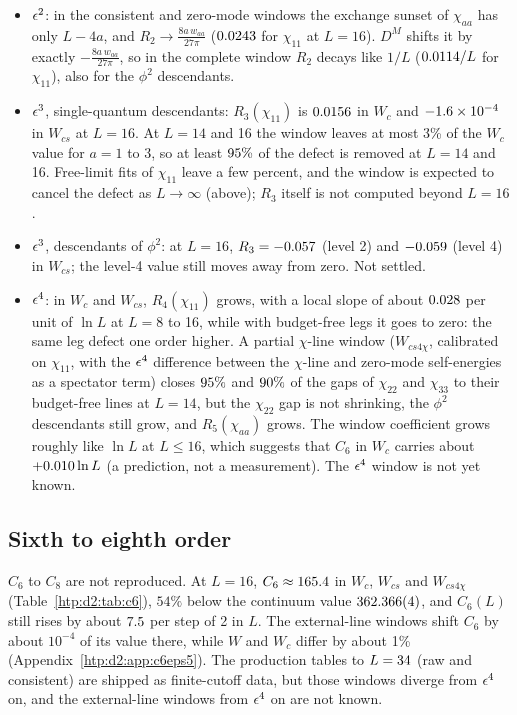 \begin{itemize}
\item $\epsilon^2$: in the consistent and zero-mode windows the exchange sunset of $\chi_{aa}$ has only $L-4a$, and
 $R_2\to\frac{8a\,w_{aa}}{27\pi}$ ($0.0243$ for $\chi_{11}$ at $L=16$). $D^M$ shifts it by exactly
 $-\frac{8a\,w_{aa}}{27\pi}$, so in the complete window $R_2$ decays like $1/L$ ($0.0114/L$ for $\chi_{11}$), also for
 the $\phi^2$ descendants.
\item $\epsilon^3$, single-quantum descendants: $R_3(\chi_{11})$ is $0.0156$ in $W_c$ and $-1.6\times10^{-4}$ in
 $W_{cs}$ at $L=16$. At $L=14$ and 16 the window leaves at most 3\% of the $W_c$ value for $a=1$ to 3, so at least
 $95\%$ of the defect is removed at $L=14$ and 16. Free-limit fits of $\chi_{11}$ leave a few percent, and the window is
 expected to cancel the defect as $L\to\infty$ (above); $R_3$ itself is not computed beyond
 $L=16$.
\item $\epsilon^3$, descendants of $\phi^2$: at $L=16$, $R_3=-0.057$ (level 2) and $-0.059$ (level 4) in $W_{cs}$;
 the level-4 value still moves away from zero. Not settled.
\item $\epsilon^4$: in $W_c$ and $W_{cs}$, $R_4(\chi_{11})$ grows, with a local slope of about $0.028$ per unit of $\ln L$
 at $L=8$ to 16, while with budget-free legs it goes
 to zero: the same leg defect one order higher. A partial $\chi$-line window ($W_{cs4\chi}$, calibrated on $\chi_{11}$, with the
 $\epsilon^4$ difference between the $\chi$-line and zero-mode self-energies as a spectator term) closes $95\%$ and
 $90\%$ of the gaps of $\chi_{22}$ and $\chi_{33}$ to their budget-free lines at $L=14$, but the $\chi_{22}$ gap is not
 shrinking, the $\phi^2$ descendants still grow, and $R_5(\chi_{aa})$ grows. The window coefficient grows roughly like $\ln L$
 at $L\le16$, which suggests that
 $C_6$ in $W_c$ carries about $+0.010\ln L$ (a prediction, not a measurement). The $\epsilon^4$ window is not yet known.
\end{itemize}

\subsection{Sixth to eighth order}\label{htp:d2:c6}
$C_6$ to $C_8$ are not reproduced. At $L=16$, $C_6\approx165.4$ in $W_c$, $W_{cs}$ and $W_{cs4\chi}$
(Table~\ref{htp:d2:tab:c6}), $54\%$ below the continuum value $362.366(4)$, and $C_6(L)$ still rises by about
$7.5$ per step of 2 in $L$. The external-line windows shift $C_6$ by about $10^{-4}$ of its value there, while
$W$ and $W_c$ differ by about 1\% (Appendix~\ref{htp:d2:app:c6eps5}). The production tables to $L=34$ (raw and
consistent) are shipped as finite-cutoff data, but those windows diverge from $\epsilon^4$ on, and the external-line windows
from $\epsilon^4$ on are not known.
